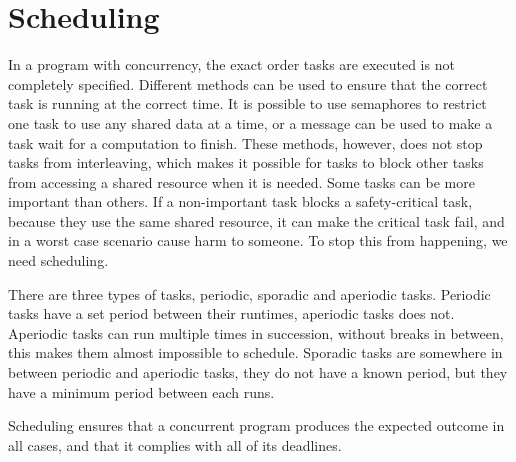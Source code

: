 \section{Scheduling}
In a program with concurrency, the exact order tasks are executed is not completely specified. Different methods can be used to ensure that the correct task is running at the correct time. It is possible to use semaphores to restrict one task to use any shared data at a time, or a message can be used to make a task wait for a computation to finish. These methods, however, does not stop tasks from interleaving, which makes it possible for tasks to block other tasks from accessing a shared resource when it is needed. Some tasks can be more important than others. If a non-important task blocks a safety-critical task, because they use the same shared resource, it can make the critical task fail, and in a worst case scenario cause harm to someone. To stop this from happening, we need scheduling\cite{rts-book}.

There are three types of tasks, periodic, sporadic and aperiodic tasks. Periodic tasks have a set period between their runtimes, aperiodic tasks does not. Aperiodic tasks can run multiple times in succession, without breaks in between, this makes them almost impossible to schedule. Sporadic tasks are somewhere in between periodic and aperiodic tasks, they do not have a known period, but they have a minimum period between each runs.

Scheduling ensures that a concurrent program produces the expected outcome in all cases, and that it complies with all of its deadlines.

